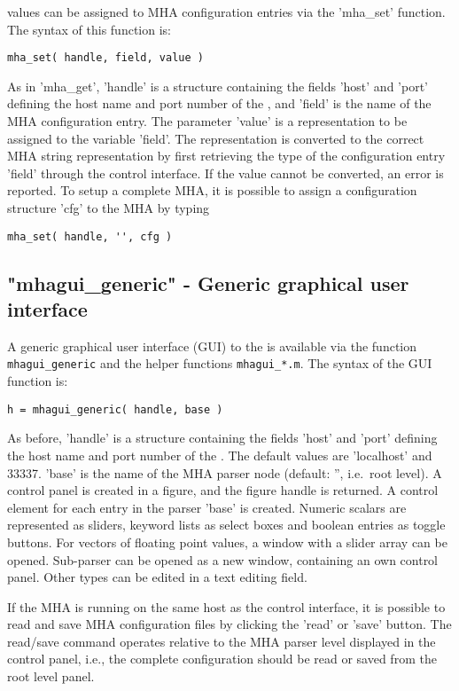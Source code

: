 \Matlab{} values can be assigned to MHA configuration entries via the
'mha\_set' function.
%
The syntax of this function is:
\begin{verbatim}mha_set( handle, field, value )\end{verbatim}
%
As in 'mha\_get', 'handle' is a structure containing the fields 'host'
and 'port' defining the host name and port number of the \mhad{}, and
'field' is the name of the MHA configuration entry.
%
The parameter 'value' is a \Matlab{} representation to be assigned to
the variable 'field'.
%
The \Matlab{} representation is converted to the correct MHA string
representation by first retrieving the type of the configuration entry
'field' through the control interface.
%
If the \Matlab{} value cannot be converted, an error is reported.
%
To setup a complete MHA, it is possible to assign a \Matlab{}
configuration structure 'cfg' to the MHA by typing
\begin{verbatim}mha_set( handle, '', cfg )\end{verbatim}

\subsection{"mhagui\_generic" - Generic graphical user interface}
\label{sec:mhagui_generic}

A generic graphical user interface (GUI) to the \mhad{} is available
via the function \verb!mhagui_generic! and the helper functions
\verb!mhagui_*.m!.
%
The syntax of the GUI function is:
\begin{verbatim}
h = mhagui_generic( handle, base )
\end{verbatim}
%
As before, 'handle' is a structure containing the fields 'host' and
'port' defining the host name and port number of the \mhad{}. The
default values are 'localhost' and 33337.
%
'base' is the name of the MHA parser node (default: '', i.e.\ root level).
%
A control panel is created in a \Matlab{} figure, and the figure
handle is returned.
%
A control element for each entry in the parser 'base' is created.
%
Numeric scalars are represented as sliders, keyword lists as select
boxes and boolean entries as toggle buttons.
%
For vectors of floating point values, a window with a slider array can
be opened.
%
Sub-parser can be opened as a new window, containing an own control
panel.
%
Other types can be edited in a text editing field.

If the MHA is running on the same host as the \Matlab{} control
interface, it is possible to read and save MHA configuration files by
clicking the 'read' or 'save' button. The read/save command operates
relative to the MHA parser level displayed in the control panel, i.e.,
the complete configuration should be read or saved from the root level
panel.

